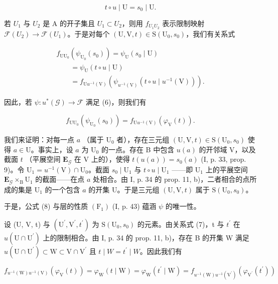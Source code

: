 \[
t \circ u \mid \mathrm{U} = s _ {0} \mid \mathrm{U}.\tag{7}
\]

若 \(U_{1}\) 与 \(U_{2}\) 是 A 的开子集且 \(U_{1} \subset U_{2}\)，则用 \(f_{U_{1}U_{2}}\) 表示限制映射 \(\mathcal{F}(U_{2}) \to \mathcal{F}(U_{1})\)。于是对每个 \((\mathrm{U}, \mathrm{V}, t) \in \mathrm{S}(\mathrm{U}_{0}, s_{0})\)，我们有关系式

\[
\begin{array}{l} f_{\mathrm{U}\mathrm{U}_{0}}(\psi_{\mathrm{U}_{0}}(s_{0})) = \psi_{\mathrm{U}}(s_{0} \mid \mathrm{U}) \\ \qquad = \psi_{\mathrm{U}}(t \circ u \mid \mathrm{U}) \\ \qquad = f_{\mathrm{U}u^{-1}(\mathrm{V})}(\psi_{u^{-1}(\mathrm{V})}(t \circ u \mid u^{-1}(\mathrm{V}))). \end{array}
\]

因此，若 \(\psi \colon u^{*}(\mathcal{G})\to \mathcal{F}\) 满足 (6)，则我们有

\[
f_{\mathrm{U}\mathrm{U}_{0}}(\psi_{\mathrm{U}_{0}}(s_{0})) = f_{\mathrm{U}u^{-1}(\mathrm{V})}(\varphi_{\mathrm{V}}(t)).\tag{8}
\]

我们来证明：对每一点 \(a\) （属于 \(\mathrm{U}_0\) 者），存在三元组 \((\mathrm{U},\mathrm{V},t)\in \mathrm{S}(\mathrm{U}_0,s_0)\) 使得 \(a\in \mathrm{U}\)。事实上，设 \(a\) 为 \(\mathrm{U}_0\) 的一点。存在 B 中包含 \(u(a)\) 的开邻域 V，以及截面 \(t\) （平展空间 \(\mathbf{E}_{\mathcal{G}}\) 在 V 上的），使得 \(t(u(a)) = s_0(a)\) (I, p. 33, prop. 9)。令 \(\mathrm{U}_1 = u^{-1} (\mathrm{V})\cap \mathrm{U}_0\)。截面 \(s_0\mid \mathrm{U}_1\) 与 \(t\circ u\mid \mathrm{U}_1\) ——即 \(\mathrm{U}_1\) 上的平展空间 \(\mathbf{E}_{\mathcal{G}}\times_{\mathrm{B}}\mathrm{U}_1\) 的截面——在点 \(a\) 处相合。由 I, p. 34 的 prop. 11, b)，二者相合的点所成的集是 \(\mathrm{U}_1\) 的一个包含 \(a\) 的开集 U。于是三元组 \((\mathrm{U},\mathrm{V},t)\) 属于 \(\mathrm{S}(\mathrm{U}_0,s_0)\)。

于是，公式 (8) 与层的性质 \((\mathrm{F}_{1})\) (I, p. 43) 蕴涵 \(\psi\) 的唯一性。

设 (U, V, t) 与 \((\mathrm{U}^{\prime}, \mathrm{V}^{\prime}, t^{\prime})\) 为 \(\mathrm{S}(\mathrm{U}_{0}, s_{0})\) 的元素。由关系式 (7)，t 与 \(t^{\prime}\) 在 \(u(\mathrm{U} \cap \mathrm{U}^{\prime})\) 上的限制相合。由 I, p. 34 的 prop. 11, b)，存在 B 的开集 W 满足 \(u(\mathrm{U} \cap \mathrm{U}^{\prime}) \subset \mathrm{W} \subset \mathrm{V} \cap \mathrm{V}^{\prime}\) 且 \(t \mid W = t^{\prime} \mid W\)。因此我们有

\[
f_{u^{-1}(\mathrm{W})u^{-1}(\mathrm{V})}(\varphi_{\mathrm{V}}(t)) = \varphi_{\mathrm{W}}(t\mid \mathrm{W}) = \varphi_{\mathrm{W}}(t^{\prime}\mid \mathrm{W}) = f_{u^{-1}(\mathrm{W})u^{-1}(\mathrm{V}^{\prime})}(\varphi_{\mathrm{V}^{\prime}}(t^{\prime}))
\]


